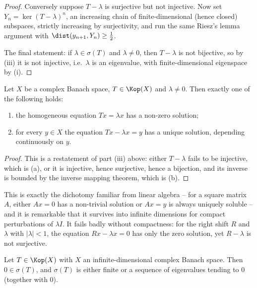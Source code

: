 \begin{proof}
	Conversely suppose $T - \lambda$ is surjective but not injective. Now set $Y_n = \ker(T-\lambda)^n$, an increasing chain of finite-dimensional (hence closed) subspaces, strictly increasing by surjectivity, and run the same Riesz's lemma argument with $\dist(y_{n+1}, Y_n)\geq\frac12$.

	The final statement: if $\lambda \in \sigma(T)$ and $\lambda \neq 0$, then $T-\lambda$ is not bijective, so by (iii) it is not injective, i.e.\ $\lambda$ is an eigenvalue, with finite-dimensional eigenspace by (i).
\end{proof}

\begin{theorem}
	Let $X$ be a complex Banach space, $T\in\Kop(X)$ and $\lambda\neq0$. Then exactly one of the following holds:
	\begin{enumerate}[label=(\alph*)]
		\item the homogeneous equation $Tx = \lambda x$ has a non-zero solution;
		\item for every $y \in X$ the equation $Tx - \lambda x = y$ has a unique solution, depending continuously on $y$.
	\end{enumerate}
\end{theorem}

\begin{proof}
	This is a restatement of part (iii) above: either $T-\lambda$ fails to be injective, which is (a), or it is injective, hence surjective, hence a bijection, and its inverse is bounded by the inverse mapping theorem, which is (b).
\end{proof}

This is exactly the dichotomy familiar from linear algebra -- for a square matrix $A$, either $Ax=0$ has a non-trivial solution or $Ax=y$ is always uniquely soluble -- and it is remarkable that it survives into infinite dimensions for compact perturbations of $\lambda I$. It fails badly without compactness: for the right shift $R$ and $\lambda$ with $|\lambda|<1$, the equation $Rx-\lambda x = 0$ has only the zero solution, yet $R-\lambda$ is not surjective.

\begin{theorem}
	Let $T \in\Kop(X)$ with $X$ an infinite-dimensional complex Banach space. Then $0 \in\sigma(T)$, and $\sigma(T)$ is either finite or a sequence of eigenvalues tending to $0$ (together with $0$).
\end{theorem}

